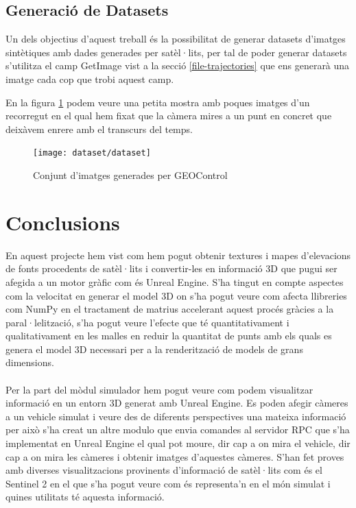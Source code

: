 \documentclass[10pt,a4paper,twocolumn,twoside]{article}
\begin{document}
\subsection{Generació de Datasets}
Un dels objectius d'aquest treball és la possibilitat de generar datasets d'imatges sintètiques amb dades generades per satèl·lits, per tal de poder generar datasets s'utilitza el camp GetImage vist a la secció \ref{file-trajectories} que ens generarà una imatge cada cop que trobi aquest camp.

En la figura \ref{fig-dataset} podem veure una petita mostra amb poques imatges d'un recorregut en el qual hem fixat que la càmera mires a un punt en concret que deixàvem enrere amb el transcurs del temps. 

\begin{figure}[!h]
\centering
  	\texttt{[image: dataset/dataset]}
	\caption{Conjunt d'imatges generades per GEOControl}
	\label{fig-dataset}
\end{figure}

\section{Conclusions}
En aquest projecte hem vist com hem pogut obtenir textures i mapes d'elevacions de fonts procedents de satèl·lits i convertir-les en informació 3D que pugui ser afegida a un motor gràfic com és Unreal Engine. S'ha tingut en compte aspectes com la velocitat en generar el model 3D on s'ha pogut veure com afecta llibreries com NumPy en el tractament de matrius accelerant aquest procés gràcies a la paral·lelització, s'ha pogut veure l'efecte que té quantitativament i qualitativament en les malles en reduir la quantitat de punts amb els quals es genera el model 3D necessari per a la renderització de models de grans dimensions.
\\
\\
Per la part del mòdul simulador hem pogut veure com podem visualitzar informació en un entorn 3D generat amb Unreal Engine. Es poden afegir càmeres a un vehicle simulat i veure des de diferents perspectives una mateixa informació per això s'ha creat un altre modulo que envia comandes al servidor RPC que s'ha implementat en Unreal Engine el qual pot moure, dir cap a on mira el vehicle, dir cap a on mira les càmeres i obtenir imatges d'aquestes càmeres.
S'han fet proves amb diverses visualitzacions provinents d'informació de satèl·lits com és el Sentinel 2 en el que s'ha pogut veure com és representa'n en el món simulat i quines utilitats té aquesta informació.
\end{document}
